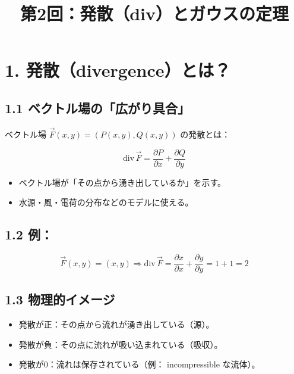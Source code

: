 \documentclass[a4,11pt]{article}
\title{第2回：発散（div）とガウスの定理}
\author{}
\date{}
\begin{document}
\maketitle

\section*{1. 発散（divergence）とは？}

\subsection*{1.1 ベクトル場の「広がり具合」}
ベクトル場 $\vec{F}(x, y) = (P(x, y), Q(x, y))$ の発散とは：

\[
\mathrm{div} \, \vec{F} = \frac{\partial P}{\partial x} + \frac{\partial Q}{\partial y}
\]

\begin{itemize}
  \item ベクトル場が「その点から湧き出しているか」を示す。
  \item 水源・風・電荷の分布などのモデルに使える。
\end{itemize}

\subsection*{1.2 例：}
\[
\vec{F}(x, y) = (x, y) \Rightarrow \mathrm{div} \, \vec{F} = \frac{\partial x}{\partial x} + \frac{\partial y}{\partial y} = 1 + 1 = 2
\]

\begin{center}
\end{center}

\subsection*{1.3 物理的イメージ}
\begin{itemize}
  \item 発散が正：その点から流れが湧き出している（源）。
  \item 発散が負：その点に流れが吸い込まれている（吸収）。
  \item 発散が0：流れは保存されている（例： incompressible な流体）。
\end{itemize}
\end{document}
